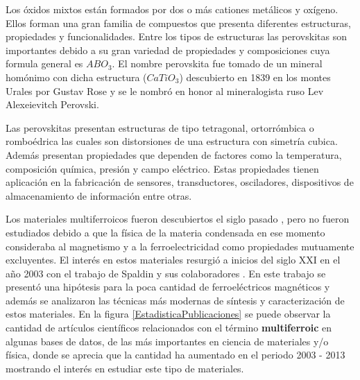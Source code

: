Los \'oxidos mixtos est\'an formados por dos o m\'as cationes met\'alicos y ox\'igeno. Ellos forman una gran  familia de compuestos que presenta diferentes estructuras, propiedades y funcionalidades. Entre los tipos de estructuras las perovskitas son importantes debido a su gran variedad de propiedades y composiciones cuya formula general es $ABO_{3}$. El nombre perovskita fue tomado de un mineral hom\'onimo con dicha estructura ($CaTiO_{3}$) descubierto en 1839 en los montes Urales por Gustav Rose y se le nombr\'o en honor al mineralogista ruso Lev Alexeievitch Perovski.


\noindent Las perovskitas presentan estructuras de tipo tetragonal, ortorr\'ombica o rombo\'edrica las cuales son distorsiones de una estructura con simetr\'ia cubica. Adem\'as presentan propiedades que dependen de factores como la temperatura, composici\'on qu\'imica, presi\'on y campo el\'ectrico. Estas propiedades tienen aplicaci\'on en la fabricaci\'on de sensores, transductores, osciladores, dispositivos de almacenamiento de informaci\'on entre otras.


\noindent Los materiales multiferroicos fueron descubiertos el siglo pasado \cite{wang2003}, pero no fueron estudiados debido a que la f\'isica de la materia condensada en ese momento consideraba al magnetismo y a la ferroelectricidad como propiedades mutuamente excluyentes. El inter\'es en estos materiales resurgi\'o a inicios del siglo XXI en el a\~no 2003 con el trabajo de Spaldin y sus colaboradores \cite{spaldin2005}. En este trabajo se present\'o una hip\'otesis para la poca cantidad de ferroel\'ectricos magn\'eticos y adem\'as se analizaron las t\'ecnicas m\'as modernas de s\'intesis y caracterizaci\'on de estos materiales. En la figura \ref{EstadisticaPublicaciones} se puede observar la cantidad de art\'iculos cient\'ificos relacionados con el t\'ermino {\bf multiferroic} en algunas bases de datos, de las m\'as importantes en ciencia de materiales y/o f\'isica, donde se aprecia que la cantidad ha aumentado en el periodo 2003 - 2013 mostrando el inter\'es en estudiar este tipo de materiales.



